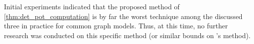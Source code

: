 Initial experiments indicated that the proposed method of \cref{thm:det_pot_computation} is by far the worst technique among the discussed three in practice for common graph models.
Thus, at this time, no further research was conducted on this specific method (or similar bounds on \algjs's method).
